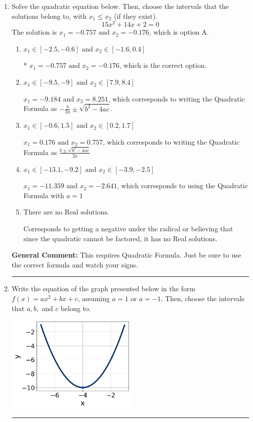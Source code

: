 \documentclass{extbook}[14pt]
\newcommand{\litem}[1]{\item #1

\rule{\textwidth}{0.4pt}}
\begin{document}
\begin{enumerate}\litem{
Solve the quadratic equation below. Then, choose the intervals that the solutions belong to, with $x_1 \leq x_2$ (if they exist).
\[ 15x^{2} +14 x + 2 = 0 \]
The solution is \( x_1 = -0.757 \text{ and } x_2 = -0.176 \), which is option A.\begin{enumerate}[label=\Alph*.]
\item \( x_1 \in [-2.5, -0.6] \text{ and } x_2 \in [-1.6, 0.4] \)

* $x_1 = -0.757 \text{ and } x_2 = -0.176$, which is the correct option.
\item \( x_1 \in [-9.5, -9] \text{ and } x_2 \in [7.9, 8.4] \)

 $x_1 = -9.184 \text{ and } x_2 = 8.251$, which corresponds to writing the Quadratic Formula as $-\frac{b}{2a} \pm \sqrt{b^2 - 4ac}$.
\item \( x_1 \in [-0.6, 1.5] \text{ and } x_2 \in [0.2, 1.7] \)

 $x_1 = 0.176 \text{ and } x_2 = 0.757$, which corresponds to writing the Quadratic Formula as $\frac{b \pm \sqrt{b^2 - 4ac}}{2a}$
\item \( x_1 \in [-13.1, -9.2] \text{ and } x_2 \in [-3.9, -2.5] \)

 $x_1 = -11.359 \text{ and } x_2 = -2.641$, which corresponds to using the Quadratic Formula with $a=1$
\item \( \text{There are no Real solutions.} \)

Corresponds to getting a negative under the radical or believing that since the quadratic cannot be factored, it has no Real solutions.
\end{enumerate}

\textbf{General Comment:} This requires Quadratic Formula. Just be sure to use the correct formula and watch your signs.
}
\litem{
Write the equation of the graph presented below in the form $f(x)=ax^2+bx+c$, assuming  $a=1$ or $a=-1$. Then, choose the intervals that $a, b,$ and $c$ belong to.

\begin{center}
    \includegraphics[width=0.5\textwidth]{../Figures/quadraticGraphToEquationCopyA.png}
\end{center}



}
\end{enumerate}
\end{document}
